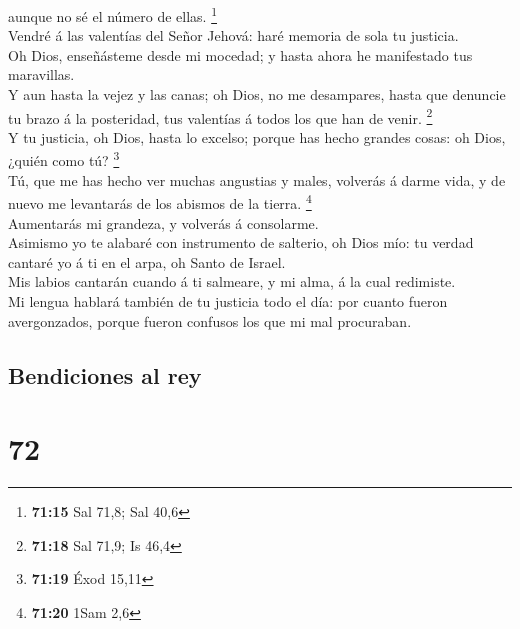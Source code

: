 aunque no sé el número de ellas. \footnote{\textbf{71:15} Sal 71,8; Sal
  40,6}\\
 Vendré á las valentías del Señor Jehová: haré memoria de
sola tu justicia.\\
 Oh Dios, enseñásteme desde mi mocedad; y hasta ahora he
manifestado tus maravillas.\\
 Y aun hasta la vejez y las canas; oh Dios, no me
desampares, hasta que denuncie tu brazo á la posteridad, tus valentías á
todos los que han de venir. \footnote{\textbf{71:18} Sal 71,9; Is 46,4}\\
 Y tu justicia, oh Dios, hasta lo excelso; porque has hecho
grandes cosas: oh Dios, ¿quién como tú? \footnote{\textbf{71:19} Éxod
  15,11}\\
 Tú, que me has hecho ver muchas angustias y males,
volverás á darme vida, y de nuevo me levantarás de los abismos de la
tierra. \footnote{\textbf{71:20} 1Sam 2,6}\\
 Aumentarás mi grandeza, y volverás á consolarme.\\
 Asimismo yo te alabaré con instrumento de salterio, oh
Dios mío: tu verdad cantaré yo á ti en el arpa, oh Santo de Israel.\\
 Mis labios cantarán cuando á ti salmeare, y mi alma, á la
cual redimiste.\\
 Mi lengua hablará también de tu justicia todo el día: por
cuanto fueron avergonzados, porque fueron confusos los que mi mal
procuraban.

\hypertarget{bendiciones-al-rey}{%
\subsection{Bendiciones al rey}\label{bendiciones-al-rey}}

\hypertarget{section-71}{%
\section{72}\label{section-71}}

